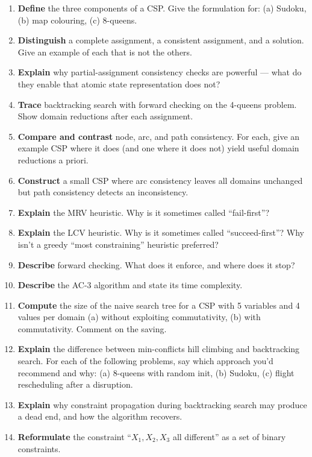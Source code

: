 \documentclass[11pt, a4paper]{article}
\begin{document}
\begin{enumerate}
  \item \textbf{Define} the three components of a CSP. Give the formulation for: (a) Sudoku, (b) map colouring, (c) 8-queens.
  \item \textbf{Distinguish} a complete assignment, a consistent assignment, and a solution. Give an example of each that is not the others.
  \item \textbf{Explain} why partial-assignment consistency checks are powerful — what do they enable that atomic state representation does not?
  \item \textbf{Trace} backtracking search with forward checking on the 4-queens problem. Show domain reductions after each assignment.
  \item \textbf{Compare and contrast} node, arc, and path consistency. For each, give an example CSP where it does (and one where it does not) yield useful domain reductions a priori.
  \item \textbf{Construct} a small CSP where arc consistency leaves all domains unchanged but path consistency detects an inconsistency.
  \item \textbf{Explain} the MRV heuristic. Why is it sometimes called ``fail-first''?
  \item \textbf{Explain} the LCV heuristic. Why is it sometimes called ``succeed-first''? Why isn't a greedy ``most constraining'' heuristic preferred?
  \item \textbf{Describe} forward checking. What does it enforce, and where does it stop?
  \item \textbf{Describe} the AC-3 algorithm and state its time complexity.
  \item \textbf{Compute} the size of the naive search tree for a CSP with 5 variables and 4 values per domain (a) without exploiting commutativity, (b) with commutativity. Comment on the saving.
  \item \textbf{Explain} the difference between min-conflicts hill climbing and backtracking search. For each of the following problems, say which approach you'd recommend and why: (a) 8-queens with random init, (b) Sudoku, (c) flight rescheduling after a disruption.
  \item \textbf{Explain} why constraint propagation during backtracking search may produce a dead end, and how the algorithm recovers.
  \item \textbf{Reformulate} the constraint ``$X_1, X_2, X_3$ all different'' as a set of binary constraints.
\end{enumerate}
\end{document}
